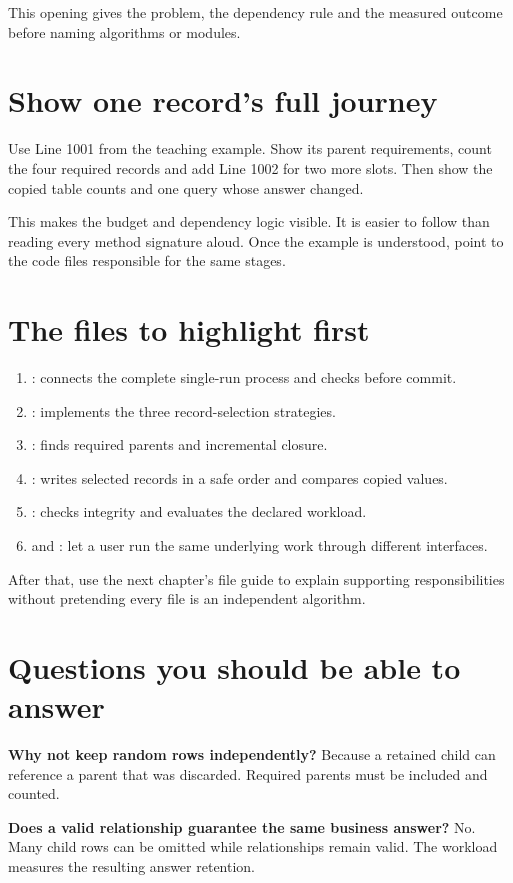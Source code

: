\documentclass[12pt,a4paper,oneside]{report}
\begin{document}
This opening gives the problem, the dependency rule and the measured outcome before naming algorithms or modules.

\section{Show one record's full journey}
Use Line 1001 from the teaching example. Show its parent requirements, count the four required records and add Line 1002 for two more slots. Then show the copied table counts and one query whose answer changed.

This makes the budget and dependency logic visible. It is easier to follow than reading every method signature aloud. Once the example is understood, point to the code files responsible for the same stages.

\section{The files to highlight first}
\begin{enumerate}
\item {}: connects the complete single-run process and checks before commit.
\item {}: implements the three record-selection strategies.
\item {}: finds required parents and incremental closure.
\item {}: writes selected records in a safe order and compares copied values.
\item {}: checks integrity and evaluates the declared workload.
\item {} and : let a user run the same underlying work through different interfaces.
\end{enumerate}
After that, use the next chapter's file guide to explain supporting responsibilities without pretending every file is an independent algorithm.

\section{Questions you should be able to answer}
\textbf{Why not keep random rows independently?} Because a retained child can reference a parent that was discarded. Required parents must be included and counted.

\textbf{Does a valid relationship guarantee the same business answer?} No. Many child rows can be omitted while relationships remain valid. The workload measures the resulting answer retention.
\end{document}
